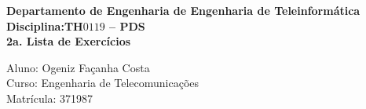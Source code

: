 \documentclass[a4paper,12pt]{article}
\begin{document}
{
%
     {\sf
       \vspace*{4cm}
      \begin{center}
         {\Large {\bfseries Departamento de Engenharia de Engenharia de Teleinformática}}\\
         \vspace*{1.0cm}
         {\Large{\bfseries Disciplina:TH$0119$ -- PDS}}\\
         \vspace*{1.0cm}
         {\large{\bfseries 2a. Lista de Exercícios}}
     \end{center}
 \vspace*{12.0cm}
    {\Large
        \begin{flushleft}
	       \noindent Aluno: Ogeniz Façanha Costa\\
	       Curso: Engenharia de Telecomunicações\\
	       Matrícula: 371987\\
        \end{flushleft}}
    }
%
\newpage
%
% 

}
%


%
\end{document}
